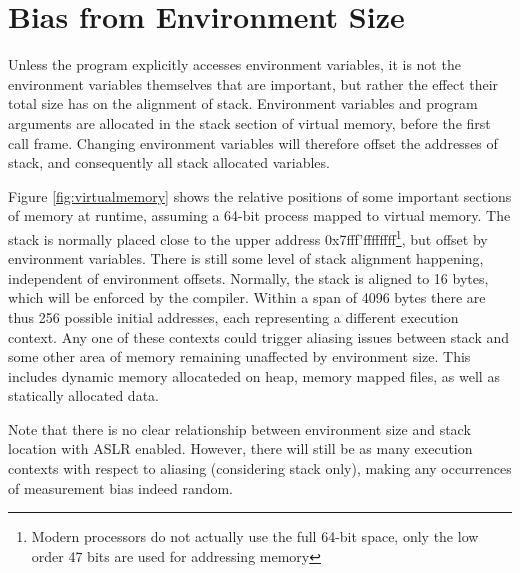 \documentclass[prodmode,acmtaco]{acmsmall}
\begin{document}
\section{Bias from Environment Size}
Unless the program explicitly accesses environment variables, it is not the environment variables themselves that are important, but rather the effect their total size has on the alignment of stack.
Environment variables and program arguments are allocated in the stack section of virtual memory, before the first call frame.
Changing environment variables will therefore offset the addresses of stack, and consequently all stack allocated variables.

Figure \ref{fig:virtualmemory} shows the relative positions of some important sections of memory at runtime, assuming a 64-bit process mapped to virtual memory. 
The stack is normally placed close to the upper address 0x7fff'ffffffff\footnote{Modern processors do not actually use the full 64-bit space, only the low order 47 bits are used for addressing memory}, but offset by environment variables.
There is still some level of stack alignment happening, independent of environment offsets. 
Normally, the stack is aligned to 16 bytes, which will be enforced by the compiler. %
Within a span of 4096 bytes there are thus 256 possible initial addresses, each representing a different execution context.
Any one of these contexts could trigger aliasing issues between stack and some other area of memory remaining unaffected by environment size.
This includes dynamic memory allocateded on heap, memory mapped files, as well as statically allocated data. 

Note that there is no clear relationship between environment size and stack location with ASLR enabled.
However, there will still be as many execution contexts with respect to aliasing (considering stack only), making any occurrences of measurement bias indeed random.
\end{document}
